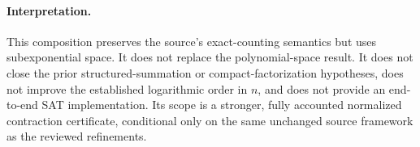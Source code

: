 \paragraph{Interpretation.}
This composition preserves the source's exact-counting semantics but uses
subexponential space.  It does not replace the polynomial-space result.
It does not close the prior structured-summation or compact-factorization
hypotheses, does not improve the established logarithmic order in $n$, and
does not provide an end-to-end SAT implementation.  Its scope is a stronger,
fully accounted normalized contraction certificate, conditional only on the
same unchanged source framework as the reviewed refinements.
